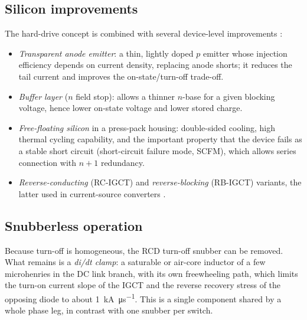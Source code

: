 \documentclass[11pt,a4paper]{report}
\begin{document}
\subsection{Silicon improvements}

The hard-drive concept is combined with several device-level improvements
\cite{steimer1999igct,lutz2011}:

\begin{itemize}[nosep]
  \item \emph{Transparent anode emitter}: a thin, lightly doped $p$ emitter whose
        injection efficiency depends on current density, replacing anode shorts;
        it reduces the tail current and improves the on-state/turn-off trade-off.
  \item \emph{Buffer layer} ($n$ field stop): allows a thinner $n$-base for a
        given blocking voltage, hence lower on-state voltage and lower stored
        charge.
  \item \emph{Free-floating silicon} in a press-pack housing: double-sided
        cooling, high thermal cycling capability, and the important property that
        the device fails as a stable short circuit (short-circuit failure mode,
        SCFM), which allows series connection with $n+1$ redundancy.
  \item \emph{Reverse-conducting} (RC-IGCT) and \emph{reverse-blocking}
        (RB-IGCT) variants, the latter used in current-source converters
        \cite{weber2000rbigct}.
\end{itemize}

\subsection{Snubberless operation}

Because turn-off is homogeneous, the RCD turn-off snubber can be removed. What
remains is a \emph{di/dt clamp}: a saturable or air-core inductor of a few
microhenries in the DC link branch, with its own freewheeling path, which limits
the turn-on current slope of the IGCT and the reverse recovery stress of the
opposing diode to about \SI{1}{\kilo\ampere\per\micro\second}. This is a single
component shared by a whole phase leg, in contrast with one snubber per switch.
\end{document}
